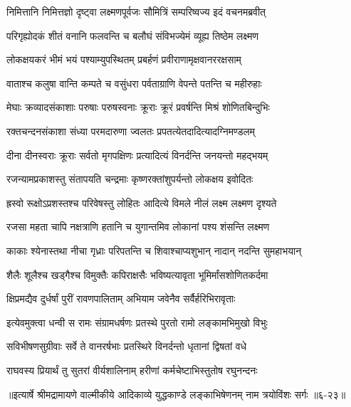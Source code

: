 
\twolineshloka
{निमित्तानि निमित्तज्ञो दृष्ट्वा लक्ष्मणपूर्वजः}
{सौमित्रिं सम्परिष्वज्य इदं वचनमब्रवीत्} %

\twolineshloka
{परिगृह्योदकं शीतं वनानि फलवन्ति च}
{बलौघं संविभज्येमं व्यूह्य तिष्ठेम लक्ष्मण} %

\twolineshloka
{लोकक्षयकरं भीमं भयं पश्याम्युपस्थितम्}
{प्रबर्हणं प्रवीराणामृक्षवानररक्षसाम्} %

\twolineshloka
{वाताश्च कलुषा वान्ति कम्पते च वसुंधरा}
{पर्वताग्राणि वेपन्ते पतन्ति च महीरुहाः} %

\twolineshloka
{मेघाः क्रव्यादसंकाशाः परुषाः परुषस्वनाः}
{क्रूराः क्रूरं प्रवर्षन्ति मिश्रं शोणितबिन्दुभिः} %

\twolineshloka
{रक्तचन्दनसंकाशा संध्या परमदारुणा}
{ज्वलतः प्रपतत्येतदादित्यादग्निमण्डलम्} %

\twolineshloka
{दीना दीनस्वराः क्रूराः सर्वतो मृगपक्षिणः}
{प्रत्यादित्यं विनर्दन्ति जनयन्तो महद्भयम्} %

\twolineshloka
{रजन्यामप्रकाशस्तु संतापयति चन्द्रमाः}
{कृष्णरक्तांशुपर्यन्तो लोकक्षय इवोदितः} %

\twolineshloka
{ह्रस्वो रूक्षोऽप्रशस्तश्च परिवेषस्तु लोहितः}
{आदित्ये विमले नीलं लक्ष्म लक्ष्मण दृश्यते} %

\twolineshloka
{रजसा महता चापि नक्षत्राणि हतानि च}
{युगान्तमिव लोकानां पश्य शंसन्ति लक्ष्मण} %

\twolineshloka
{काकाः श्येनास्तथा नीचा गृध्राः परिपतन्ति च}
{शिवाश्चाप्यशुभान् नादान् नदन्ति सुमहाभयान्} %

\twolineshloka
{शैलैः शूलैश्च खड्गैश्च विमुक्तैः कपिराक्षसैः}
{भविष्यत्यावृता भूमिर्मांसशोणितकर्दमा} %

\twolineshloka
{क्षिप्रमद्यैव दुर्धर्षां पुरीं रावणपालिताम्}
{अभियाम जवेनैव सर्वैर्हरिभिरावृताः} %

\twolineshloka
{इत्येवमुक्त्वा धन्वी स रामः संग्रामधर्षणः}
{प्रतस्थे पुरतो रामो लङ्कामभिमुखो विभुः} %

\twolineshloka
{सविभीषणसुग्रीवाः सर्वे ते वानरर्षभाः}
{प्रतस्थिरे विनर्दन्तो धृतानां द्विषतां वधे} %

\twolineshloka
{राघवस्य प्रियार्थं तु सुतरां वीर्यशालिनाम्}
{हरीणां कर्मचेष्टाभिस्तुतोष रघुनन्दनः} %


॥इत्यार्षे श्रीमद्रामायणे वाल्मीकीये आदिकाव्ये युद्धकाण्डे लङ्काभिषेणनम् नाम त्रयोविंशः सर्गः ॥६-२३॥
